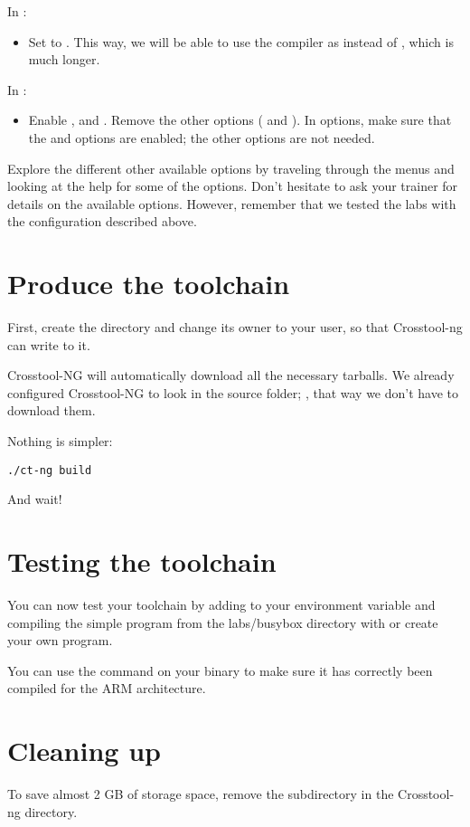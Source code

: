 In :
\begin{itemize}
\item Set  to . This way, we will be able
  to use the compiler as  instead of
  , which is much longer.
\end{itemize}

In :
\begin{itemize}
\item Enable ,  and . Remove the
  other options ( and ). In  options, make
  sure that the  and  options are
  enabled; the other options are not needed.
\end{itemize}

Explore the different other available options by traveling through the
menus and looking at the help for some of the options. Don't hesitate
to ask your trainer for details on the available options. However,
remember that we tested the labs with the configuration described
above.

\section{Produce the toolchain}

First, create the directory  and change its
owner to your user, so that Crosstool-ng can write to it.

Crosstool-NG will automatically download all the necessary tarballs.
We already configured Crosstool-NG to look in the source folder;
, that way we don't have to download them.

Nothing is simpler:

\begin{verbatim}
./ct-ng build
\end{verbatim}

And wait!

\section{Testing the toolchain}

You can now test your toolchain by adding
 to your
 environment variable and compiling the simple
 program from the labs/busybox directory with
 or create your own program.

You can use the  command on your binary to make sure it has
correctly been compiled for the ARM architecture.

\section{Cleaning up}

To save almost 2 GB of storage space, remove the 
subdirectory in the Crosstool-ng directory.
